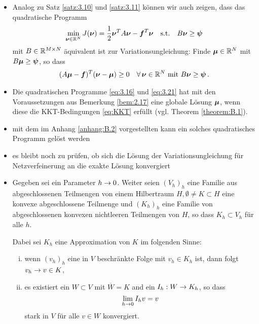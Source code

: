 \begin{itemize}
\item \begin{bem}\label{bem:3.12}
Analog zu Satz \ref{satz:3.10} und \ref{satz:3.11} können wir auch zeigen, dass das quadratische Programm
\begin{align}\label{eq:3.21}
	\min_{\boldsymbol\nu \in \mathbb{R}^N} J(\boldsymbol\nu) = \frac 1 2 \boldsymbol \nu^T A \boldsymbol \nu - \boldsymbol f^T \boldsymbol \nu \quad \text{s.t.} \quad B\boldsymbol\nu \ge \boldsymbol \psi
\end{align}
mit $B \in \mathbb{R}^{M\times N}$ äquivalent ist zur Variationsungleichung: Finde $\boldsymbol\mu \in \mathbb{R}^N$ mit $B\boldsymbol\mu \ge \boldsymbol \psi$, so dass
\begin{align}\label{eq:3.22}
	(A\boldsymbol\mu - \boldsymbol f)^T (\boldsymbol\nu-\boldsymbol\mu) \ge 0 \quad \forall\, \boldsymbol\nu \in \mathbb{R}^N \text{ mit } B \boldsymbol \nu \ge \boldsymbol\psi \, .
\end{align}
\end{bem}


\item \begin{bem}
Die quadratischen Programme \eqref{eq:3.16} und \eqref{eq:3.21} hat mit den Voraussetzungen aus Bemerkung \ref{bem:2.17} eine globale Lösung $\boldsymbol\mu$, wenn diese die KKT-Bedingungen \eqref{eq:KKT} erfüllt (vgl. Theorem \ref{theorem:B.1}).
\end{bem}

\item mit dem im Anhang \ref{anhang:B.2} vorgestellten  kann ein solches quadratisches Programm gelöst werden

\item es bleibt noch zu prüfen, ob sich die Lösung der Variationsungleichung für Netzverfeinerung an die exakte Lösung konvergiert

\item \begin{vor}
Gegeben sei ein Parameter $h \rightarrow 0$. Weiter seien $(V_h)_h$ eine Familie aus abgeschlossenen Teilmengen von einem Hilbertraum $H, \emptyset \not= K \subset H$ eine konvexe abgeschlossene Teilmenge und $(K_h)_h$ eine Familie von abgeschlossenen konvexen nichtleeren Teilmengen von $H$, so dass $K_h \subset V_h$ für alle $h$.

Dabei sei $K_h$ eine Approximation von $K$ im folgenden Sinne:
\begin{enumerate}[(i)]
\item wenn $(v_h)_h$ eine in $V$ beschränkte Folge mit $v_h \in K_h$ ist, dann folgt $v_h \rightarrow v \in K$,
\item es existiert ein $W \subset V$ mit $\overline W = K$ and ein $I_h: W \rightarrow K_h$, so dass
\[
	\lim_{h\rightarrow 0} I_h v = v
\]
stark in $V$ für alle $v \in W$ konvergiert.
\end{enumerate}
\end{vor}


\end{itemize}
